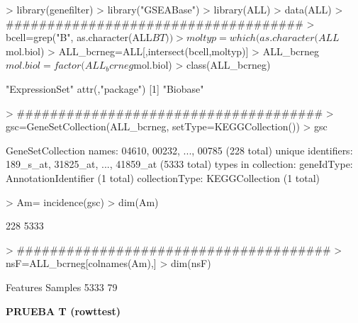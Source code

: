 \documentclass{article}
\begin{document}
\begin{Schunk}
\begin{Sinput}
> library(genefilter)
> library("GSEABase")
> library(ALL)
> data(ALL)
> ####################################
> bcell=grep("B", as.character(ALL$BT))
> moltyp=which(as.character(ALL$mol.biol) %
> ALL_bcrneg=ALL[,intersect(bcell,moltyp)]
> ALL_bcrneg$mol.biol=factor(ALL_bcrneg$mol.biol)
> class(ALL_bcrneg)
\end{Sinput}
\begin{Soutput}
[1] "ExpressionSet"
attr(,"package")
[1] "Biobase"
\end{Soutput}
\begin{Sinput}
> #####################################
> gsc=GeneSetCollection(ALL_bcrneg, setType=KEGGCollection())
> gsc
\end{Sinput}
\begin{Soutput}
GeneSetCollection
  names: 04610, 00232, ..., 00785 (228 total)
  unique identifiers: 189_s_at, 31825_at, ..., 41859_at (5333 total)
  types in collection:
    geneIdType: AnnotationIdentifier (1 total)
    collectionType: KEGGCollection (1 total)
\end{Soutput}
\begin{Sinput}
> Am= incidence(gsc)
> dim(Am)
\end{Sinput}
\begin{Soutput}
[1]  228 5333
\end{Soutput}
\begin{Sinput}
> ######################################
> nsF=ALL_bcrneg[colnames(Am),]
> dim(nsF)
\end{Sinput}
\begin{Soutput}
Features  Samples 
    5333       79 
\end{Soutput}
\end{Schunk}
\textbf{PRUEBA T (rowttest)}
\end{document}
